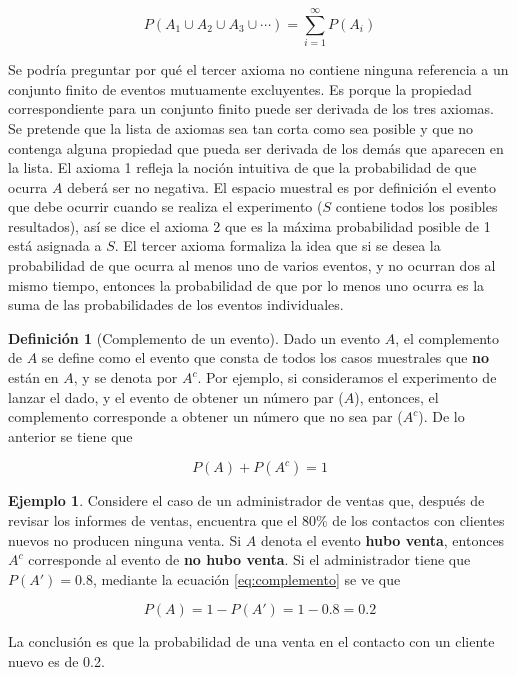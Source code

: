 \documentclass[
  11pt,
]{book}
\theoremstyle{definition}
\newtheorem{definition}{Definición}[chapter]
\theoremstyle{definition}
\newtheorem{example}{Ejemplo}[chapter]
\theoremstyle{definition}
\theoremstyle{definition}
\theoremstyle{remark}
\begin{document}
\[
P(A_{1} \cup A_{2} \cup A_{3} \cup \cdots) = \sum_{i=1}^{\infty} P(A_{i})
\]

Se podría preguntar por qué el tercer axioma no contiene ninguna referencia a un conjunto finito de eventos mutuamente excluyentes. Es porque la propiedad correspondiente para un conjunto finito puede ser derivada de los tres axiomas. Se pretende que la lista de axiomas sea tan corta como sea posible y que no contenga alguna propiedad que pueda ser derivada de los demás que aparecen en la lista. El axioma 1 refleja la noción intuitiva de que la probabilidad de que ocurra \(A\) deberá ser no negativa. El espacio muestral es por definición el evento que debe ocurrir cuando se realiza el experimento (\(S\) contiene todos los posibles resultados), así se dice el axioma 2 que es la máxima probabilidad posible de 1 está asignada a \(S\). El tercer axioma formaliza la idea que si se desea la probabilidad de que ocurra al menos uno de varios eventos, y no ocurran dos al mismo tiempo, entonces la probabilidad de que por lo menos uno ocurra es la suma de las probabilidades de los eventos individuales. \citep[página 52]{Devore}

\begin{definition}[Complemento de un evento]

Dado un evento \(A\), el complemento de \(A\) se define como el evento que consta de todos los casos muestrales que \textbf{no} están en \(A\), y se denota por \(A^c\). Por ejemplo, si consideramos el experimento de lanzar el dado, y el evento de obtener un número par (\(A\)), entonces, el complemento corresponde a obtener un número que no sea par (\(A^c\)). De lo anterior se tiene que

\begin{equation}
P(A) + P(A^c) = 1
\label{eq:complemento}
\end{equation}

\end{definition}

\begin{example}
Considere el caso de un administrador de ventas que, después de revisar los informes de ventas, encuentra que el 80\% de los contactos con clientes nuevos no producen ninguna venta. Si \(A\) denota el evento \textbf{hubo venta}, entonces \(A^c\) corresponde al evento de \textbf{no hubo venta}. Si el administrador tiene que \(P(A') = 0.8\), mediante la ecuación \eqref{eq:complemento} se ve que

\[P(A) = 1 - P(A') = 1 - 0.8 = 0.2\]

La conclusión es que la probabilidad de una venta en el contacto con un cliente nuevo es de 0.2.
\end{example}
\end{document}
